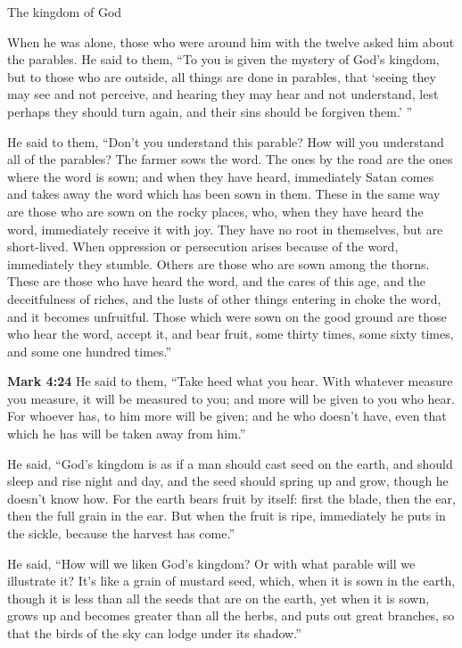 \documentclass[10pt,twoside]{article} %
\newcommand{\quotesize}{\normalsize{}}
\newenvironment{quotetext}{\begingroup\quotesize}{\endgroup}
\newcommand{\intex}[1]{\index[texts]{#1}}
\newcommand{\bible}[2]{\begin{quotetext}\textbf{#1}\intex{#1} #2\end{quotetext}}
\newcommand{\gospelmark}[2]{\bible{Mark #1}{#2}}
\begin{document}
\begin{section}{The kingdom of God}
{  When he was alone, those who were around him with the twelve asked him about the parables.   He said to them, ``To you is given the mystery of God's kingdom, but to those who are outside, all things are done in parables,    that `seeing they may see and not perceive, and hearing they may hear and not understand, lest perhaps they should turn again, and their sins should be forgiven them.' ''

  He said to them, ``Don't you understand this parable? How will you understand all of the parables?    The farmer sows the word.    The ones by the road are the ones where the word is sown; and when they have heard, immediately Satan comes and takes away the word which has been sown in them.    These in the same way are those who are sown on the rocky places, who, when they have heard the word, immediately receive it with joy.    They have no root in themselves, but are short-lived. When oppression or persecution arises because of the word, immediately they stumble.    Others are those who are sown among the thorns. These are those who have heard the word,    and the cares of this age, and the deceitfulness of riches, and the lusts of other things entering in choke the word, and it becomes unfruitful.    Those which were sown on the good ground are those who hear the word, accept it, and bear fruit, some thirty times, some sixty times, and some one hundred times.''}


\gospelmark{4:24}{
  He said to them, ``Take heed what you hear. With whatever measure you measure, it will be measured to you; and more will be given to you who hear.    For whoever has, to him more will be given; and he who doesn't have, even that which he has will be taken away from him.''

  He said, ``God's kingdom is as if a man should cast seed on the earth,    and should sleep and rise night and day, and the seed should spring up and grow, though he doesn't know how.    For the earth bears fruit by itself: first the blade, then the ear, then the full grain in the ear.    But when the fruit is ripe, immediately he puts in the sickle, because the harvest has come.''

  He said, ``How will we liken God's kingdom? Or with what parable will we illustrate it?    It's like a grain of mustard seed, which, when it is sown in the earth, though it is less than all the seeds that are on the earth,    yet when it is sown, grows up and becomes greater than all the herbs, and puts out great branches, so that the birds of the sky can lodge under its shadow.''

}
\end{section}
\end{document}
